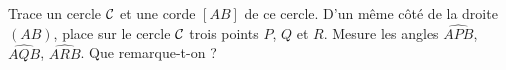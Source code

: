Trace un cercle $\cal C$ et une corde $[AB]$ de ce cercle. D'un même
côté de la droite $(AB)$, place sur le cercle $\cal C$ trois points
$P$, $Q$ et $R$. Mesure les angles $\widehat{APB}$, $\widehat{AQB}$,
$\widehat{ARB}$. Que remarque-t-on ?